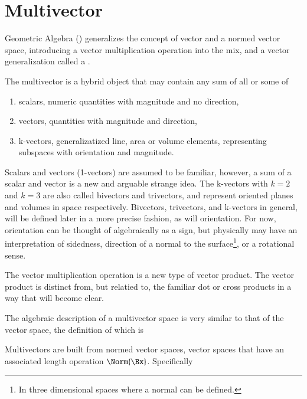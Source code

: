 \section{Multivector}
Geometric Algebra () generalizes the concept of vector and a normed vector space, introducing a vector multiplication operation into the mix, and a vector generalization called a .

The multivector is a hybrid object that may contain any sum of all or some of

\begin{enumerate}
   \item scalars, numeric quantities with magnitude and no direction,
   \item vectors, quantities with magnitude and direction,
   \item k-vectors, generalizatized line, area or volume elements, representing subspaces with orientation and magnitude.
\end{enumerate}

Scalars and vectors (1-vectors) are assumed to be familiar, however, a sum of a scalar and vector is a new and arguable strange idea.  The k-vectors with \( k=2 \) and \( k = 3 \) are also called bivectors and trivectors, and represent oriented planes and volumes in space respectively.
Bivectors, trivectors, and k-vectors in general, will be defined later in a more precise fashion, as will orientation.  For now, orientation can be thought of algebraically as a sign, but physically may have an interpretation of sidedness, direction of a normal to the surface\footnote{In three dimensional spaces where a normal can be defined.}, or a rotational sense.

The vector multiplication operation is a new type of vector product.  The vector product is distinct from, but relatied to, the familiar dot or cross products in a way that will become clear.

The algebraic description of a multivector space is very similar to that of the vector space, the definition of which is

Multivectors are built from normed vector spaces, vector spaces that have an associated
length operation \( \Norm{\Bx} \).  Specifically

